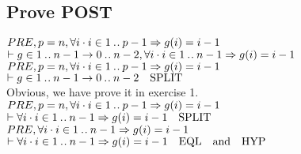 \documentclass[11pt,a4paper,fleqn]{article}
\begin{document}
\subsection{Prove POST}
\noindent
$PRE,p=n,\forall i\cdot i\in 1\mathbin{.\mkern1mu.} p-1\Rightarrow g(i)=i-1$\\
$\vdash g\in 1\mathbin{.\mkern1mu.} n-1\rightarrow 0\mathbin{.\mkern1mu.} n-2,
\forall i\cdot i\in 1\mathbin{.\mkern1mu.} n-1\Rightarrow g(i)=i-1$\\
$PRE,p=n,\forall i\cdot i\in 1\mathbin{.\mkern1mu.} p-1\Rightarrow g(i)=i-1$\\
$\vdash g\in 1\mathbin{.\mkern1mu.} n-1\rightarrow 0\mathbin{.\mkern1mu.} n-2\quad\text{SPLIT}$\\
Obvious, we have prove it in exercise 1.\\
$PRE,p=n,\forall i\cdot i\in 1\mathbin{.\mkern1mu.} p-1\Rightarrow g(i)=i-1$\\
$\vdash\forall i\cdot i\in 1\mathbin{.\mkern1mu.} n-1\Rightarrow g(i)=i-1\quad\text{SPLIT}$\\
$PRE,\forall i\cdot i\in 1\mathbin{.\mkern1mu.} n-1\Rightarrow g(i)=i-1$\\
$\vdash\forall i\cdot i\in 1\mathbin{.\mkern1mu.} n-1\Rightarrow g(i)=i-1\quad\text{EQL\quad and\quad HYP}$\\


%
%
\end{document}
